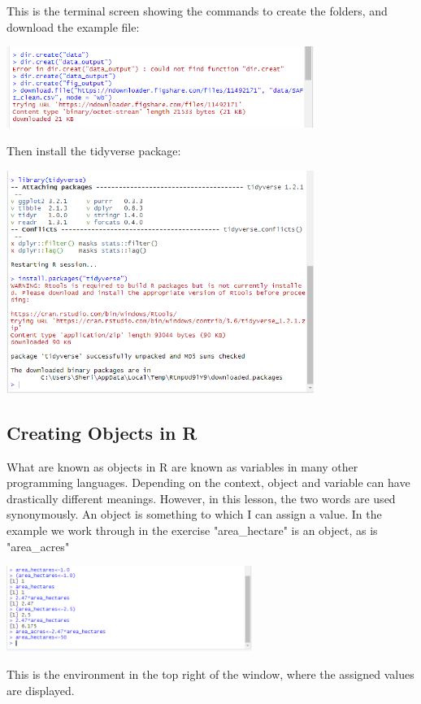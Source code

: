 \documentclass{article}
\begin{document}
This is the terminal screen showing the commands to create the folders, and download the example file:

\includegraphics[width=10cm]{Images/RStudio003.PNG}


Then install the tidyverse package:

\includegraphics[width=10cm]{Images/RStudio004.PNG}

\subsection{Creating Objects in R}

What are known as objects in R are known as variables in many other programming languages. Depending on the context, object and variable can have drastically different meanings. However, in this lesson, the two words are used synonymously. 
An object is something to which I can assign a value. In the example we work through in the exercise "area\_hectare" is an object, as is "area\_acres"



\includegraphics[width=8cm]{Images/RStudio005.PNG}

This is the environment in the top right of the window, where the assigned values are displayed.
\end{document}
